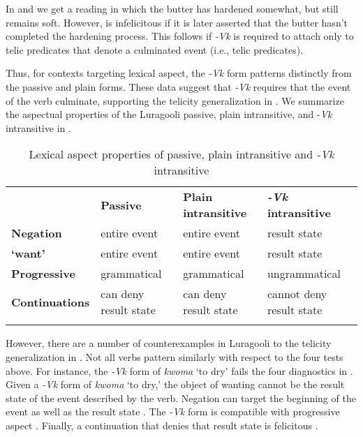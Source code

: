 \documentclass[output=paper]{langsci/langscibook}
\begin{document}
In  and  we get a reading in which the butter has hardened somewhat, but still remains soft. However,  is infelicitous if it is later asserted that the butter hasn’t completed the hardening process. This follows if \textit{-Vk} is required to attach only to telic predicates that denote a culminated event (i.e., telic predicates).

Thus, for contexts targeting lexical aspect, the \textit{-Vk} form patterns distinctly from the passive and plain forms. These data suggest that \textit{-Vk} requires that the event of the verb culminate, supporting the telicity generalization in . We summarize the aspectual properties of the Luragooli passive, plain intransitive, and -\textit{Vk} intransitive in . 

\begin{table}
\caption{Lexical aspect properties of passive, plain intransitive and \textit{-Vk} intransitive}
\label{tab:3}

\begin{tabularx}{\textwidth}{XXXX} & \textbf{Passive} & \textbf{Plain intransitive} & \textbf{\textit{-Vk}}\textbf{ intransitive}\\
\lsptoprule
\textbf{Negation} & entire event & entire event & result state\\
\textbf{‘want’} & entire event & entire event & result state\\
\textbf{Progressive} & grammatical & grammatical & ungrammatical\\
\textbf{Continuations} & can deny result state & can deny result state & cannot deny result state\\
\lspbottomrule
\end{tabularx}
\end{table}

However, there are a number of counterexamples in Luragooli to the telicity generalization in . Not all verbs pattern similarly with respect to the four tests above. For instance, the \textit{-Vk} form of \textit{kwoma} ‘to dry’ fails the four diagnostics in . Given a \textit{-Vk} form of \textit{kwoma }‘to dry,’ the object of wanting cannot be the result state  of the event described by the verb. Negation can target the beginning of the event as well as the result state . The \textit{-Vk} form is compatible with progressive aspect . Finally, a continuation that denies that result state is felicitous .
\end{document}
